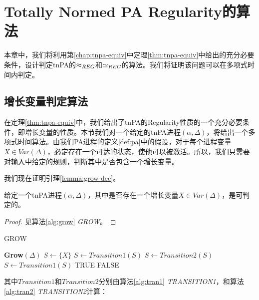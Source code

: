 \chapter{Totally Normed PA Regularity的算法}
\label{chap:tnpa-alg}

本章中，我们将利用第\ref{chap:tnpa-equiv}中定理\ref{thm:tnpa-equiv}中给出的充分必要条件，设计判定tnPA的$\approx_{REG}$和$\simeq_{REG}$的算法。我们将证明该问题可以在多项式时间内判定。

\section{增长变量判定算法}
\label{sec:grow-alg}

在定理\ref{thm:tnpa-equiv}中，我们给出了tnPA的Regularity性质的一个充分必要条件，即增长变量的性质。本节我们对一个给定的tnPA进程$(\alpha,\Delta)$，将给出一个多项式时间算法。由我们PA进程的定义\ref{def:pa}中的假设，对于每个进程变量$X\in Var(\Delta)$，必定存在一个可达的状态，使他可以被激活。所以，我们只需要对输入中给定的规则，判断其中是否包含一个增长变量。

我们现在证明引理\ref{lemma:grow-dec}。

\begin{lem}\label{lemma:grow-dec}
给定一个tnPA进程$(\alpha,\Delta)$，其中是否存在一个增长变量$X\in Var(\Delta)$，是可判定的。
\end{lem}

\begin{proof}
见算法\ref{alg:grow} \textsl{GROW}。
\end{proof}

\begin{algorithm}[htbp]
\caption{GROW}
\label{alg:grow}
\begin{algorithmic}[1]
\Statex \textbf{Grow$(\Delta)$ }
    \State $S\leftarrow \{X\}$
        \State $S\leftarrow Transition1(S)$
    \EndWhile
    \State $S\leftarrow Transition2(S)$
        \State $S\leftarrow Transition1(S)$
    \EndWhile
        \State \Return TRUE
    \EndIf
\EndFor
\State \Return FALSE

\end{algorithmic}
\end{algorithm}

其中$Transition1$和$Transition2$分别由算法\ref{alg:tran1} \textsl{TRANSITION1}，和算法\ref{alg:tran2} \textsl{TRANSITION2}计算：

